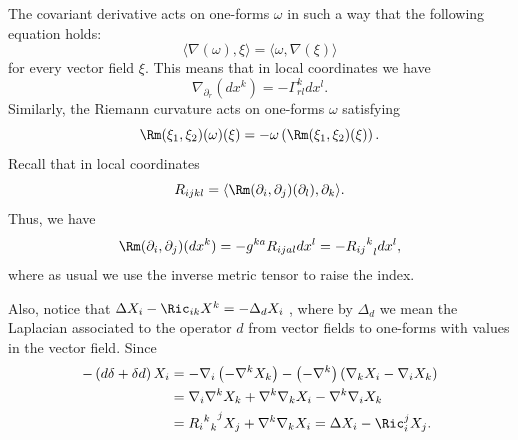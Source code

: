 \begin{remark}
\label{rem:covariant-derivative-one-forms}
The covariant derivative acts on one-forms $\omega$ in such a way
that the following equation holds:
$$\langle\nabla(\omega),\xi\rangle=\langle
\omega,\nabla(\xi)\rangle$$ for every vector field $\xi$. This means
that in local coordinates we have
$$\nabla_{\partial_r}(dx^k)=-\Gamma_{rl}^kdx^l.$$ Similarly, the Riemann
curvature acts on one-forms $\omega$ satisfying
$$\Rm(\xi_1,\xi_2)(\omega)(\xi)=-\omega\left(\Rm(\xi_1,\xi_2)(\xi)\right).$$
Recall that in local coordinates  $$R_{ijkl}=\langle \Rm(\partial_i,\partial_j)(\partial_l),\partial_k\rangle.$$ Thus, we
have
$$\Rm(\partial_i,\partial_j)(dx^k)=-g^{ka}R_{ijal}dx^l=-{{R_{ij}}^k}_ldx^l,$$
where as usual we use the inverse metric tensor to raise the index.


Also, notice that  $\Delta X_{i}-\Ric_{ik}X^{k}=-\Delta_{d}X_{i\text{ }}$, where by $\Delta_d$ we
mean the Laplacian associated to the operator $d$ from vector fields
to one-forms with values in the vector field. Since
\begin{align*}
 -\left(  d\delta+\delta d\right)  X_{i}
&  =-\nabla_{i}\left(  -\nabla^{k}X_{k}\right)  -\left(
-\nabla^{k}\right)
\left(  \nabla_{k}X_{i}-\nabla_{i}X_{k}\right) \\
&
=\nabla_{i}\nabla^{k}X_{k}+\nabla^{k}\nabla_{k}X_{i}-\nabla^{k}\nabla
_{i}X_{k}\\
&  ={{{R_{i}}^k}_k}^jX_{j}+\nabla^{k}\nabla_{k}X_{i}=\Delta
X_{i}-\Ric_i^jX_{j}.
\end{align*}
\end{remark}

